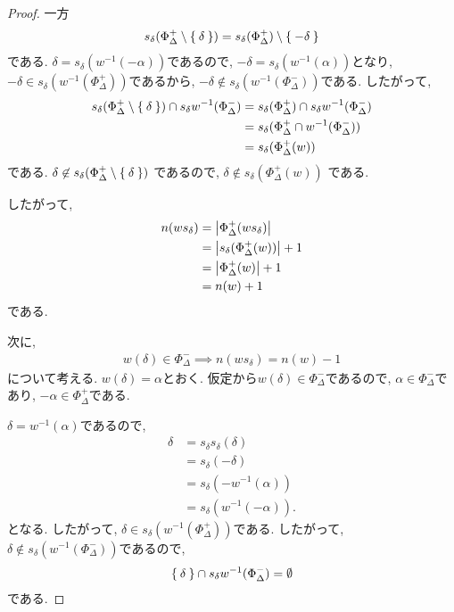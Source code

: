 \begin{proof}
  一方
  \begin{align*}
    s_\delta(\Phi_\Delta^+\setminus \Set{\delta})=s_\delta(\Phi_\Delta^+)\setminus\Set{-\delta}
  \end{align*}
  である.
  $\delta=s_\delta(w^{-1}(-\alpha))$であるので,
  $-\delta=s_\delta(w^{-1}(\alpha))$となり,  
  $-\delta\in s_\delta(w^{-1}(\Phi_\Delta^+))$であるから,
  $-\delta\not\in s_\delta(w^{-1}(\Phi_\Delta^-))$である.
  したがって,
  \begin{align*}
    s_\delta(\Phi_\Delta^+\setminus \Set{\delta}) \cap s_\delta w^{-1}(\Phi_\Delta^-)
    &=
    s_\delta(\Phi_\Delta^+) \cap s_\delta w^{-1}(\Phi_\Delta^-)\\
    &=s_\delta(\Phi_\Delta^+ \cap w^{-1}(\Phi_\Delta^-))\\
    &=s_\delta(\Phi_\Delta^+(w))
  \end{align*}
  である. 
  $\delta\not\in s_\delta(\Phi_\Delta^+\setminus \Set{\delta})$
  であるので, $\delta\not\in s_\delta(\Phi_\Delta^+(w))$
  である.

  したがって,
  \begin{align*}
    n(ws_\delta)
    &=\left|\Phi_\Delta^+(ws_\delta)\right|\\
    &=\left|s_\delta(\Phi_\Delta^+(w))\right|+1\\
    &=\left|\Phi_\Delta^+(w)\right|+1\\
    &=n(w)+1
  \end{align*}
  である.
  
  次に,
  \begin{align*}
    w(\delta)\in\Phi_\Delta^- \implies n(ws_\delta)=n(w)-1
  \end{align*}
  について考える.
  $w(\delta)=\alpha$とおく.
  仮定から$w(\delta)\in\Phi_\Delta^-$であるので,
  $\alpha\in\Phi_\Delta^-$であり,
  $-\alpha\in\Phi_\Delta^+$である.
    
  $\delta=w^{-1}(\alpha)$であるので,
  \begin{align*}
    \delta
    &=s_\delta s_\delta(\delta)\\
    &=s_\delta (-\delta)\\
    &=s_\delta(- w^{-1}(\alpha))\\
    &=s_\delta(w^{-1}(-\alpha)).
  \end{align*}
  となる. したがって,
  $\delta\in s_\delta(w^{-1}(\Phi_\Delta^+))$である.
  したがって,
  $\delta\not\in s_\delta(w^{-1}(\Phi_\Delta^-))$であるので,
  \begin{align*}
    \Set{\delta} \cap s_\delta w^{-1}(\Phi_\Delta^-) = \emptyset
  \end{align*}
  である.
  


\end{proof}
